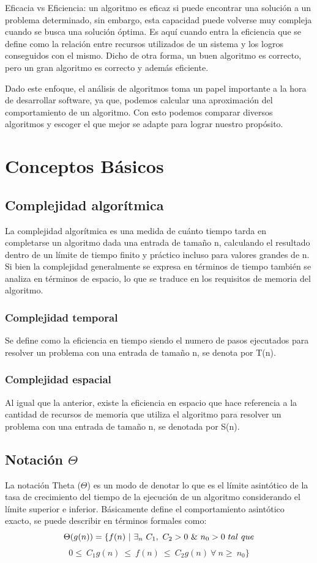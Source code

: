 \documentclass[12pt,twoside]{article}
\begin{document}
    Eficacia vs Eficiencia:
    un algoritmo es eficaz si puede encontrar una soluci\'on a un problema determinado, sin embargo, esta capacidad puede volverse muy compleja cuando se busca una soluci\'on \'optima. Es aqu\'i cuando entra la eficiencia que se define como la relaci\'on entre recursos utilizados de un sistema y los logros conseguidos con el mismo. Dicho de otra forma, un buen algoritmo es correcto, pero un gran algoritmo es correcto y adem\'as eficiente.
    
    Dado este enfoque, el an\'alisis de algoritmos toma un papel importante a la hora de desarrollar software, ya que, podemos calcular una aproximaci\'on del comportamiento de un algoritmo. Con esto podemos comparar diversos algoritmos y escoger el que mejor se adapte para lograr nuestro prop\'osito.


\section{Conceptos B\'asicos}
\subsection{Complejidad algor\'itmica}
    La complejidad algor\'itmica es una medida de cuánto tiempo tarda en completarse un algoritmo dada una entrada de tama\~no n, calculando el resultado dentro de un límite de tiempo finito y práctico incluso para valores grandes de n. Si bien la complejidad generalmente se expresa en términos de tiempo también se analiza en términos de espacio, lo que se traduce en los requisitos de memoria del algoritmo.
\subsubsection{Complejidad temporal}
    Se define como la eficiencia en tiempo siendo el numero de pasos ejecutados para resolver un problema con una entrada de tama\~no n, se denota por T(n).
\subsubsection{Complejidad espacial}
Al igual que la anterior, existe la eficiencia en espacio que hace referencia a la cantidad de recursos de memoria que utiliza el algoritmo para resolver un problema con una entrada de tama\~no n, se denotada por S(n).
\subsection{Notaci\'on $\Theta$}
La notación Theta ($\Theta$) es un modo de denotar lo que es el límite asintótico de la tasa de crecimiento del tiempo de la ejecución de un algoritmo considerando el límite superior e inferior. Básicamente define el comportamiento asintótico exacto, se puede describir en t\'erminos formales como:
$$\Theta(g(n)) = \{ f(n)~\arrowvert~\exists_{n}~C_{1},~C_{2}>0~\&~n_{0}>0~tal~que$$ $$0\leq~C_{1}g(n)~\leq~f(n)~\leq~C_{2}g(n)~\forall~n\geq~n_{0}\}$$
\end{document}
